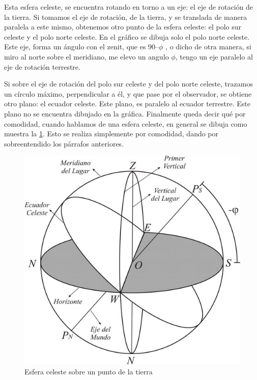 Esta esfera celeste, se encuentra rotando en torno a un eje: el eje de rotación de la tierra. Si tomamos el eje de rotación, de la tierra, y se translada de manera paralela a este mismo, obtenemos otro punto de la esfera celeste: el polo sur celeste y el polo norte celeste. En el gráfico se dibuja solo el polo norte celeste. Este eje, forma un ángulo con el zenit, que es $90 – \phi$ , o dicho de otra manera, si miro al norte sobre el meridiano, me elevo un angulo $\phi$, tengo un eje paralelo al eje de rotación terrestre. 


Si sobre el eje de rotación del polo sur celeste y del polo norte celeste, trazamos un círculo máximo, perpendicular a él, y que pase por el observador, se obtiene otro plano: el ecuador celeste. Este plano, es paralelo al ecuador terrestre. Este plano no se encuentra dibujado en la gráfica. 
Finalmente queda decir qué por comodidad, cuando hablamos de una esfera celeste, en general se dibuja como muestra la \ref{fig:esfera_celeste_point_earth}. Esto se realiza simplemente por comodidad, dando por sobreentendido los párrafos anteriores. 

\begin{figure}[ht!]
	\centering
	\includegraphics[scale=0.5]{esfera_celeste_lugar}
	\caption{Esfera celeste sobre un punto de la tierra}
	\label{fig:esfera_celeste_point_earth}
\end{figure}


